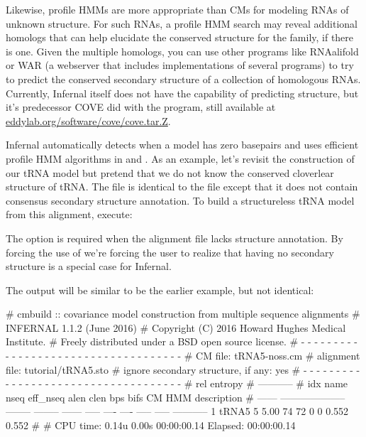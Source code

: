 Likewise, profile HMMs are more appropriate than CMs for modeling RNAs
of unknown structure. For such RNAs, a profile HMM search may reveal
additional homologs that can help elucidate the conserved structure
for the family, if there is one. Given the multiple homologs, you can
use other programs like RNAalifold \citep{Bernhart08,Hofacker02} or
WAR \citep{Torarinsson08b} (a webserver that includes implementations
of several programs) to try to predict the conserved secondary
structure of a collection of homologous RNAs. Currently, Infernal
itself does not have the capability of predicting structure, but it's
predecessor COVE did with the  program, still available at
\url{eddylab.org/software/cove/cove.tar.Z}.

Infernal automatically detects when a model has zero basepairs and
uses efficient profile HMM algorithms in  and
. As an example, let's revisit the construction of our
tRNA model but pretend that we do not know the conserved cloverlear
structure of tRNA.
The file 
 is identical to the file 
 except that it does not contain consensus
secondary structure annotation. 
To build a structureless tRNA model from this alignment, execute:


The  option is required when the alignment file lacks
structure annotation. By forcing the use of  we're
forcing the user to realize that having no secondary structure is a
special case for Infernal.

The output will be similar to be the earlier example, but not
identical:

\begin{sreoutput}
# cmbuild :: covariance model construction from multiple sequence alignments
# INFERNAL 1.1.2 (June 2016)
# Copyright (C) 2016 Howard Hughes Medical Institute.
# Freely distributed under a BSD open source license.
# - - - - - - - - - - - - - - - - - - - - - - - - - - - - - - - - - - - -
# CM file:                                            tRNA5-noss.cm
# alignment file:                                     tutorial/tRNA5.sto
# ignore secondary structure, if any:                 yes
# - - - - - - - - - - - - - - - - - - - - - - - - - - - - - - - - - - - -
#                                                                      rel entropy
#                                                                      -----------
# idx    name                     nseq eff_nseq   alen  clen  bps bifs    CM   HMM description
# ------ -------------------- -------- -------- ------ ----- ---- ---- ----- ----- -----------
       1 tRNA5                       5     5.00     74    72    0    0 0.552 0.552 
#
# CPU time: 0.14u 0.00s 00:00:00.14 Elapsed: 00:00:00.14
\end{sreoutput}

